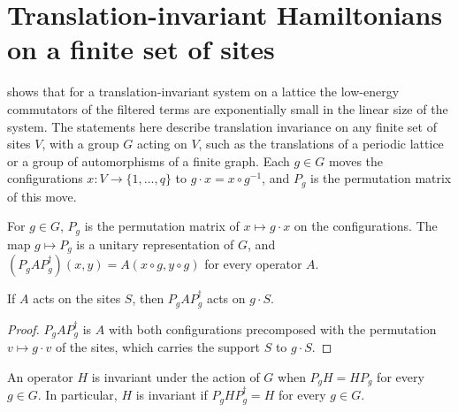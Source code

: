 \section{Translation-invariant Hamiltonians on a finite set of sites}
\label{sec:hastings_site_symmetry}


\cite{Hastings2006Solving} shows that for a translation-invariant system on a
lattice the low-energy commutators of the filtered terms are exponentially small
in the linear size of the system. The statements here describe translation
invariance on any finite set of sites $V$, with a group $G$ acting on $V$, such as
the translations of a periodic lattice or a group of automorphisms of a finite
graph. Each $g\in G$ moves the configurations $x\colon V\to\{1,\dots,q\}$ to
$g\cdot x=x\circ g^{-1}$, and $P_g$ is the permutation matrix of this move.

\begin{definition}
    \label{def:hastings_site_permutation}
    \leanok
    For $g\in G$, $P_g$ is the permutation matrix of $x\mapsto g\cdot x$ on the
    configurations. The map $g\mapsto P_g$ is a unitary representation of $G$, and
    $(P_gAP_g^\dagger)(x,y)=A(x\circ g,y\circ g)$ for every operator $A$.
\end{definition}

\begin{lemma}
    \label{thm:hastings_site_permutation_support}
    \leanok
    If $A$ acts on the sites $S$, then $P_gAP_g^\dagger$ acts on $g\cdot S$.
\end{lemma}
\begin{proof}\leanok
    $P_gAP_g^\dagger$ is $A$ with both configurations precomposed with the
    permutation $v\mapsto g\cdot v$ of the sites, which carries the support $S$ to
    $g\cdot S$.
\end{proof}

\begin{definition}
    \label{def:hastings_site_invariant}
    \leanok
    An operator $H$ is invariant under the action of $G$ when $P_gH=HP_g$ for every
    $g\in G$. In particular, $H$ is invariant if $P_gHP_g^\dagger=H$ for every
    $g\in G$.
\end{definition}

